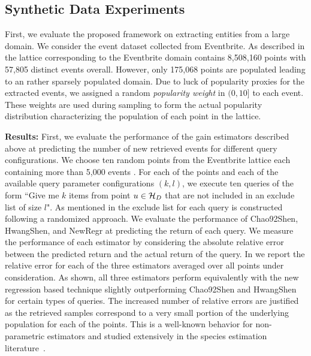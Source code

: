 \subsection{Synthetic Data Experiments}
\label{sec:synthetic}
First, we evaluate the proposed framework on extracting entities from a large domain. We consider the event dataset collected from Eventbrite. As described in  the lattice corresponding to the Eventbrite domain contains 8,508,160 points with 57,805 distinct events overall. However, only 175,068 points are populated leading to an rather sparsely populated domain. Due to luck of popularity proxies for the extracted events, we assigned a random {\em popularity weight} in $(0,10]$ to each event. These weights are used during sampling to form the actual popularity distribution characterizing the population of each point in the lattice. 

\noindent\textbf{Results:} First, we evaluate the performance of the gain estimators described above at predicting the number of new retrieved events for different query configurations. We choose ten random points from the Eventbrite lattice each containing more than 5,000 events . For each of the points and each of the available query parameter configurations $(k,l)$, we execute ten queries of the form ``Give me $k$ items from point $u \in \mathcal{H}_D$ that are not included in an exclude list of size $l$". As mentioned in  the exclude list for each query is constructed following a randomized approach. We evaluate the performance of Chao92Shen, HwangShen, and NewRegr at predicting the return of each query. We measure the performance of each estimator by considering the absolute relative error between the predicted return and the actual return of the query. In  we report the relative error for each of the three estimators averaged over all points under consideration. As shown, all three estimators perform equivalently with the new regression based technique slightly outperforming Chao92Shen and HwangShen for certain types of queries. The increased number of relative errors are justified as the retrieved samples correspond to a very small portion of the underlying population for each of the points. This is a well-known behavior for non-parametric estimators and studied extensively in the species estimation literature~\cite{hwang:2010}. 

